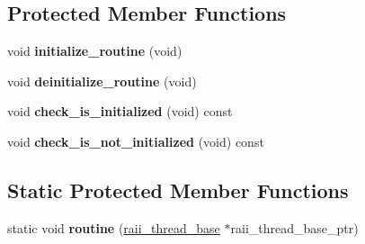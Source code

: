 \subsection*{Protected Member Functions}
\begin{DoxyCompactItemize}
\item 
\hypertarget{classxstd_1_1raii__thread__base_ad3b035606a096d6117de8de40c665507}{void {\bfseries initialize\-\_\-routine} (void)}\label{classxstd_1_1raii__thread__base_ad3b035606a096d6117de8de40c665507}

\item 
\hypertarget{classxstd_1_1raii__thread__base_ae423d8023eb8c3bed9b4b0f11c055c2d}{void {\bfseries deinitialize\-\_\-routine} (void)}\label{classxstd_1_1raii__thread__base_ae423d8023eb8c3bed9b4b0f11c055c2d}

\item 
\hypertarget{classxstd_1_1raii__thread__base_aef97fe42b58be66ddd0bf90462b772a8}{void {\bfseries check\-\_\-is\-\_\-initialized} (void) const }\label{classxstd_1_1raii__thread__base_aef97fe42b58be66ddd0bf90462b772a8}

\item 
\hypertarget{classxstd_1_1raii__thread__base_a6a179dd57da4ec48177c0cd38da0702e}{void {\bfseries check\-\_\-is\-\_\-not\-\_\-initialized} (void) const }\label{classxstd_1_1raii__thread__base_a6a179dd57da4ec48177c0cd38da0702e}

\end{DoxyCompactItemize}
\subsection*{Static Protected Member Functions}
\begin{DoxyCompactItemize}
\item 
\hypertarget{classxstd_1_1raii__thread__base_aac990e420873b2bb520e677156c37978}{static void {\bfseries routine} (\hyperlink{classxstd_1_1raii__thread__base}{raii\-\_\-thread\-\_\-base} $\ast$raii\-\_\-thread\-\_\-base\-\_\-ptr)}\label{classxstd_1_1raii__thread__base_aac990e420873b2bb520e677156c37978}

\end{DoxyCompactItemize}
